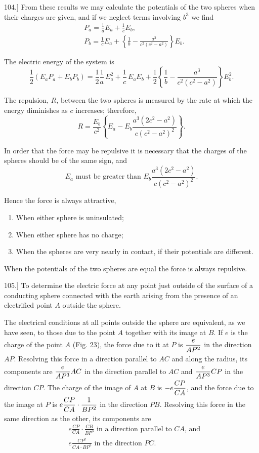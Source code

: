 \documentclass[12pt,oneside]{book}[2021/10/04]
\newcommand{\article}[1]{\phantomsection \label{art:#1}{#1.]}}
\newcommand{\xp}{\rule[-2.0ex]{0pt}{5.2ex}}
\newcommand{\¬}{\hphantom{0}}
\begin{document}
\article{104} From these results we may calculate the potentials of the
two spheres when their charges are given, and if we neglect
terms involving \(b^3\) we find
\[
   \begin{aligned}
     &P_a = \frac{1}{a} E_a + \frac{1}{c} E_b\text{,}\\
     &P_b = \frac{1}{c} E_a + \left\{\frac{1}{b} - \frac{a^3}{c^2 (c^2 - a^2)}\right\} E_b\text{.}
   \end{aligned}
\]

The electric energy of the system is
\[\frac{1}{2} (E_a P_a + E_b P_b) = \frac{1}{2} \frac{1}{a}\, E_a^2 + \frac{1}{c}\, E_a E_b + \frac{1}{2} \left\{\frac{1}{b} - \frac{a^3}{c^2 (c^2 - a^2 )}\right\} E_b^2\text{.}\]

The repulsion, \(R\), between the two spheres is measured by the
rate at which the energy diminishes as \(c\) increases; therefore,
\[R =\frac{ E_b}{c^2}\left\{E_a - E_b\frac{a^3 (2c^2 - a^2)}{c(c^2 - a^2)^2}\right\}\text{.}\]

In order that the force may be repulsive it is necessary that the
charges of the spheres should be of the same sign, and
\[E_a \text{  must be greater than  } E_b\frac{ a^3(2c^2 - a^2)}{c(c^2 - a^2)^2}.\]

Hence the force is always attractive,
\begin{enumerate}[leftmargin=4em, itemindent=0em, nosep]
  \item When either sphere is uninsulated;
  \item When either sphere has no charge;
  \item When the spheres are very nearly in contact, if their potentials
are different.
\end{enumerate}

When the potentials of the two spheres are equal the force is
always repulsive.

\article{105} To determine the electric force at any point just outside of
the surface of a conducting sphere connected with the earth arising
from the presence of an electrified point \(A\) outside the sphere.

The electrical conditions at all points outside the sphere are equivalent,
as we have seen, to those due to the point \(A\) together with its
image at \(B\). If \(e\) is the charge of the point \(A\) (Fig. 23), the force
due to it at \(P\) is \(\xp\dfrac{e}{AP^2}\) in the direction \(AP\). Resolving this force in
a direction parallel to \(AC\) and along the radius, its components are
\(\xp\dfrac{e}{AP^3} AC\) in the direction parallel to \(AC\) and \(\xp\dfrac{e}{AP^3} CP\) in the direction
\(CP\). The charge of the image of \(A\) at \(B\) is \(-e\xp\dfrac{CP}{CA}\), and the
force due to the image at \(P\) is \(e\xp\dfrac{CP}{CA} \cdot \dfrac{1}{BP^2}\) in the direction \(PB\). Resolving
this force in the same direction as the other, its components
are
\[
\begin {aligned}
&e \frac{CP}{CA} \cdot \frac{CB}{BP^3} \text{ in a direction parallel to } CA \text{, and}\\
&e \frac{CP^2}{CA \cdot BP^3} \text{ in the direction } PC\text{.}
\end{aligned}
\]
\end{document}

